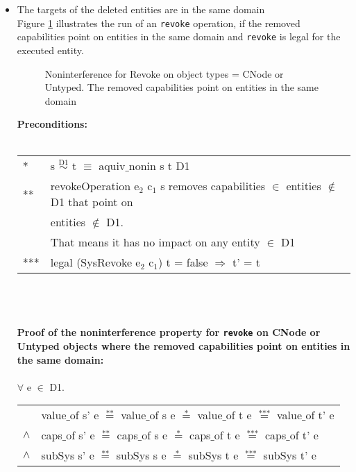 \begin{itemize}
\item The targets of the deleted entities are in the same domain \\
Figure \ref{fig:RevokeCNode} illustrates the run of an \texttt{revoke} operation, if the removed capabilities point on entities in the same domain and \texttt{revoke} is legal for the executed entity.
\begin{flushleft}
\begin{figure}[H]
\caption{Noninterference for Revoke on object types = CNode or Untyped. The removed capabilities point on entities in the same domain}
\label{fig:RevokeCNode}
\end{figure}
\end{flushleft}
\textbf{Preconditions:} \\ \\
\begin{tabular}{ll}
* & s $\overset{\text{D1}}{\sim}$ t $\equiv$ aquiv$\_$nonin s t D1	\\ 
** & revokeOperation e$_2$ c$_1$ s removes capabilities $\in$ entities $\notin$ D1 that point on \\
& entities $\notin$ D1. \\
& That means it has no impact on any entity $\in$ D1 \\ 
*** & legal (SysRevoke e$_2$ c$_1$) t = false $\Rightarrow$ t' = t
\end{tabular} \\ \\ \\
\textbf{Proof of the noninterference property for \texttt{revoke} on CNode or Untyped objects where the removed capabilities point on entities in the same domain:}\\ \\
$\forall$ e $\in$ D1. \\
\begin{tabular}{ll}
& value$\_$of s' e $\overset{\text{**}}{=}$ value$\_$of s e $\overset{\text{*}}{=}$ value$\_$of t e $\overset{\text{***}}{=}$ value$\_$of t' e \\
$\wedge$ & caps$\_$of s' e $\overset{\text{**}}{=}$ caps$\_$of s e $\overset{\text{*}}{=}$ caps$\_$of t e $\overset{\text{***}}{=}$ caps$\_$of t' e \\
$\wedge$ & subSys s' e $\overset{\text{**}}{=}$ subSys s e $\overset{\text{*}}{=}$ subSys t e $\overset{\text{***}}{=}$ subSys t' e
\end{tabular} \\

\end{itemize}
